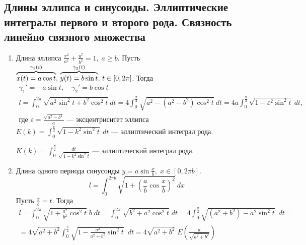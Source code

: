 \subsection{Длины эллипса и синусоиды. Эллиптические интегралы первого и второго рода. Связность линейно связного множества}

\begin{examples}
  \begin{enumerate}
    \item Длина эллипса $\frac{x^2}{a^2} + \frac{y^2}{b^2} = 1, \; a \geq b$. Пусть $\overbrace{x(t) = a\cos t}^{\mathclap{\gamma_1(t)}}, \, \overbrace{y(t) = b\sin t}^{\mathclap{\gamma_2(t)}}, \, t \in [0, 2\pi]$. Тогда
    \begin{equation*}
      \begin{gathered}
        \gamma_1' = -a\sin t, \quad \gamma_2' = b \cos t \\
        l = \int_{0}^{2\pi}\sqrt{a^2\sin^2  t + b^2\cos^2 t} \: dt =
        4\int_{0}^{\frac{\pi}{2}}\sqrt{a^2 - (a^2 - b^2)\cos^2 t} \: dt
        = 4a\int_{0}^{\frac{\pi}{2}}\sqrt{1 - \varepsilon^2\sin^2 t} \: dt
        \text{,} \\ \text{где } \varepsilon = \frac{\sqrt{a^2 - b^2}}{a}\text{ --- эксцентриситет эллипса}
      \end{gathered}
    \end{equation*}
    $ \displaystyle
        E(k) = \int_{0}^{\frac{\pi}{2}}\sqrt{1 - k^2\sin^2 t} \: dt
    $ --- эллиптический интеграл  рода.

    $ \displaystyle
        K(k) = \int_{0}^{\frac{\pi}{2}} \frac{dt}{\sqrt{1 - k^2\sin^2 t}}
    $ --- эллиптический интеграл  рода.
    \item Длина одного периода синусоиды $y = a\sin \frac{x}{b}, \; x \in [0, 2\pi b]$.
    \begin{equation*}
      l = \int_{0}^{2\pi b}\sqrt{1 + \left(\frac{a}{b}\cos \frac{x}{b}\right)^2} \: dx
    \end{equation*}
    Пусть $\frac{x}{b} = t$. Тогда
    \begin{equation*}
      \begin{gathered}
        l = \int_{0}^{2\pi} \sqrt{1 + \frac{a^2}{b^2}\cos^2 t} \; b \; dt =
        \int_{0}^{2\pi} \sqrt{b^2 + a^2\cos^2 t} \; dt =
        4\int_{0}^{\frac{\pi}{2}}\sqrt{(a^2 + b^2) - a^2\sin^2 t} \; \: dt = \\
        = 4\sqrt{a^2 + b^2}\int_{0}^{\frac{\pi}{2}}\sqrt{1 - \frac{a^2}{a^2 + b^2}\sin^2 t} \; \: dt
        = 4\sqrt{a^2 + b^2} \; E\left(\frac{a}{\sqrt{a^2 + b^2}}\right)
      \end{gathered}
    \end{equation*}
  \end{enumerate}
\end{examples}

